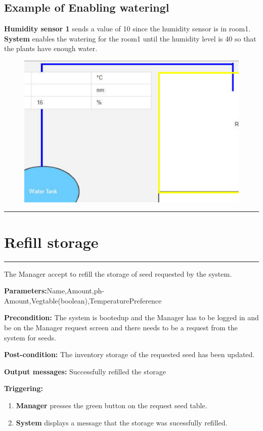 \subsection{Example of Enabling wateringl}
\textbf{Humidity sensor 1} sends a value of 10 since the humidity sensor is in
room1.
\textbf{System} enables the watering for the room1 until the humidity level is
40 so that the plants have enough water.
\begin{figure}[H]
\includegraphics[width=1\textwidth]{images/WateringOn.eps}
\end{figure}
\hfill
\vspace{0.5cm}
\hrule


\break

\section{Refill storage}

\hrule
\hfill
\vspace{0.5cm}

\label{operation:Refill storage System request}

The Manager accept to refill the storage of seed requested by the system.
\begin{description}
\item
\textbf{Parameters:}Name,Amount,ph-Amount,Vegtable(boolean),TemperaturePreference
\item \textbf{Precondition:} The system is bootedup and the Manager has to be
logged in and be on the Manager request screen and there needs to be a request
from the system for seeds.
\item \textbf{Post-condition:} The inventory storage of the requested seed has
been updated.
\item 
\item \item \textbf{Output messages:} Successfully refilled the storage
\item \textbf{Triggering:}
\begin{enumerate}
\item \textbf{Manager} presses the green button on the request seed table.
\item \textbf{System} displays a message that the storage was sucessfully
refilled.
\end{enumerate}
\end{description}

